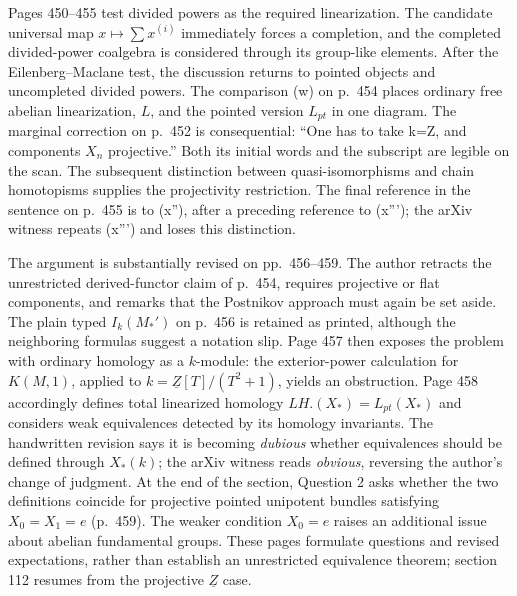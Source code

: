 Pages 450--455 test divided powers as the required linearization. The candidate universal map $x\mapsto\sum x^{(i)}$ immediately forces a completion, and the completed divided-power coalgebra is considered through its group-like elements. After the Eilenberg--Maclane test, the discussion returns to pointed objects and uncompleted divided powers. The comparison (w) on p.~454 places ordinary free abelian linearization, $L$, and the pointed version $L_{pt}$ in one diagram. The marginal correction on p.~452 is consequential: ``One has to take k=Z, and components $X_n$ projective.'' Both its initial words and the subscript are legible on the scan. The subsequent distinction between quasi-isomorphisms and chain homotopisms supplies the projectivity restriction. The final reference in the sentence on p.~455 is to (x''), after a preceding reference to (x'''); the arXiv witness repeats (x''') and loses this distinction.

The argument is substantially revised on pp.~456--459. The author retracts the unrestricted derived-functor claim of p.~454, requires projective or flat components, and remarks that the Postnikov approach must again be set aside. The plain typed $I_k(M_*')$ on p.~456 is retained as printed, although the neighboring formulas suggest a notation slip. Page 457 then exposes the problem with ordinary homology as a $k$-module: the exterior-power calculation for $K(M,1)$, applied to $k=\underline Z[T]/(T^2+1)$, yields an obstruction. Page 458 accordingly defines total linearized homology $LH.(X_*)=L_{pt}(X_*)$ and considers weak equivalences detected by its homology invariants. The handwritten revision says it is becoming \emph{dubious} whether equivalences should be defined through $X_*(k)$; the arXiv witness reads \emph{obvious}, reversing the author's change of judgment. At the end of the section, Question 2 asks whether the two definitions coincide for projective pointed unipotent bundles satisfying $X_0=X_1=e$ (p.~459). The weaker condition $X_0=e$ raises an additional issue about abelian fundamental groups. These pages formulate questions and revised expectations, rather than establish an unrestricted equivalence theorem; section 112 resumes from the projective $\underline Z$ case.

